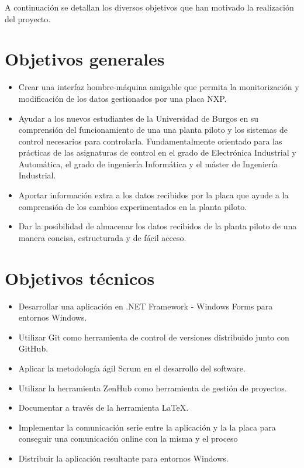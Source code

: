 
A continuación se detallan los diversos objetivos que han motivado la realización del proyecto.

\section{Objetivos generales}

\begin{itemize}
	\item Crear una interfaz hombre-máquina amigable que permita la monitorización y modificación de los datos gestionados por una placa NXP.
	\item Ayudar a los nuevos estudiantes de la Universidad de Burgos en su comprensión del funcionamiento de una una planta piloto y los sistemas de control necesarios para controlarla. Fundamentalmente orientado para las prácticas de las asignaturas de control en el grado de Electrónica Industrial y Automática, el grado de ingeniería Informática y el máster de Ingeniería Industrial.
	\item Aportar información extra a los datos recibidos por la placa que ayude a la comprensión de los cambios experimentados en la planta piloto.
	\item Dar la posibilidad de almacenar los datos recibidos de la planta piloto de una manera concisa, estructurada y de fácil acceso.
\end{itemize}

\section{Objetivos técnicos}

\begin{itemize}
	\item Desarrollar una aplicación en .NET Framework - Windows Forms para entornos Windows.
	\item Utilizar Git como herramienta de control de versiones distribuido junto con GitHub.
	\item Aplicar la metodología ágil Scrum en el desarrollo del software.
	\item Utilizar la herramienta ZenHub como herramienta de gestión de proyectos.
	\item Documentar a través de la herramienta \LaTeX.
	\item Implementar la comunicación serie entre la aplicación y la la placa para conseguir una comunicación online con la misma y el proceso
	\item Distribuir la aplicación resultante para entornos Windows.
\end{itemize}

